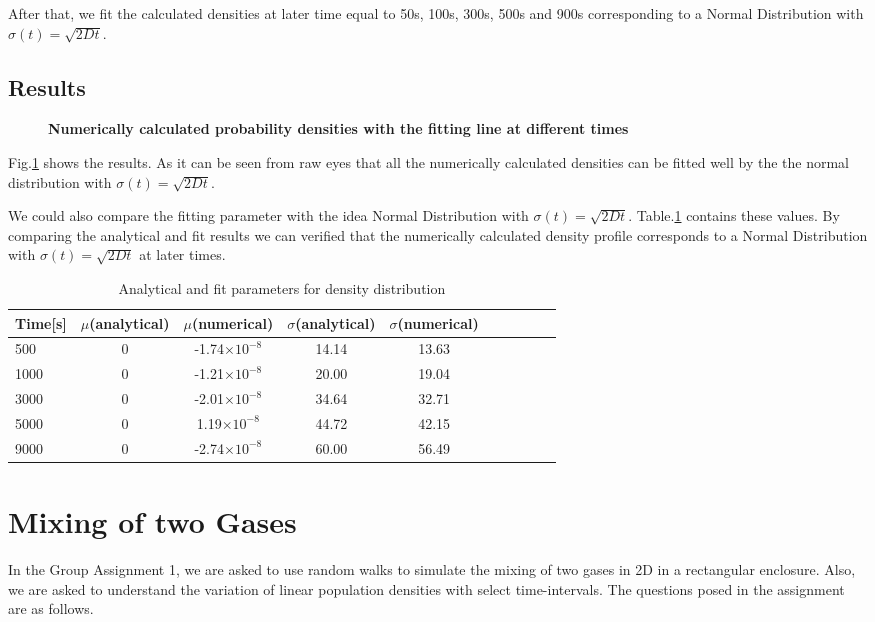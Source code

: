 \documentclass[11pt, oneside]{article}   	%
\begin{document}
After that, we fit the calculated densities at later time equal to 50s, 100s, 300s, 500s and 900s corresponding to a Normal Distribution with $\sigma(t)=\sqrt{2Dt}$.

\subsection{Results}
 
 \begin{figure}[htbp]
\begin{center}
\caption{{\bf   Numerically calculated probability densities with the fitting line at different times }}
\label{fig2}
\end{center}
\end{figure}

Fig.\ref{fig2} shows the results. As it can be seen from raw eyes that all the numerically calculated densities can be fitted well by the the normal distribution with $\sigma(t)=\sqrt{2Dt}$.

We could also compare the fitting parameter with the idea Normal Distribution with $\sigma(t)=\sqrt{2Dt}$. Table.\ref{table1} contains these values. By comparing the analytical and fit results we can verified that the numerically calculated density profile corresponds to a Normal Distribution with $\sigma(t)=\sqrt{2Dt}$ at later times. 

\begin{table}[htdp]
\caption{Analytical and fit parameters for density distribution}
\begin{center}
\begin{tabular}{l*{8}{c}r}
Time[s]              & $\mu$(analytical) & $\mu$(numerical)& $\sigma$(analytical) &$\sigma$(numerical)&  \\
\hline
500			&0	& -1.74$\times10^{-8}$ 	&14.14		&13.63  \\
1000			&0	&-1.21$\times10^{-8}$	&20.00		&19.04   \\
3000			&0 	& -2.01$\times10^{-8}$ 	&34.64		&32.71   \\
5000			&0 	& 1.19$\times10^{-8}$ 	&44.72		&42.15  \\
9000			&0 	& -2.74$\times10^{-8}$ 	&60.00		&56.49	\\
\end{tabular}
\end{center}
\label{table1}
\end{table}


\section{Mixing of two Gases}
In the Group Assignment 1, we are asked to use random walks to simulate the mixing of two gases in 2D in a rectangular enclosure. Also, we are asked to understand the variation of linear population densities with select time-intervals. The questions posed in the assignment are as follows.
\end{document}
